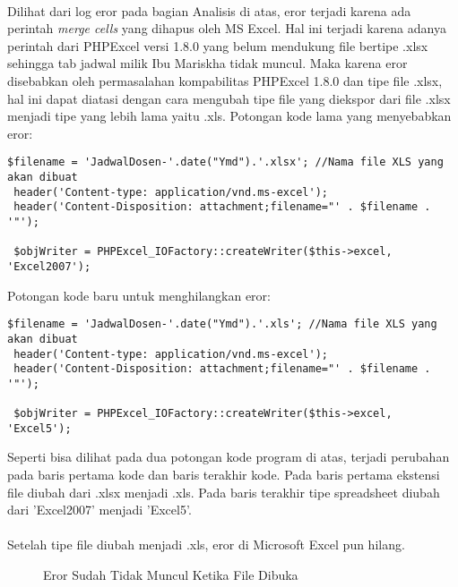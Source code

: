 \paragraph{}Dilihat dari log eror pada bagian Analisis di atas, eror terjadi karena ada perintah \textit{merge cells} yang dihapus oleh MS Excel. Hal ini terjadi karena adanya perintah dari PHPExcel versi 1.8.0 yang belum mendukung file bertipe .xlsx sehingga tab jadwal milik Ibu Mariskha tidak muncul. Maka karena eror disebabkan oleh permasalahan kompabilitas PHPExcel 1.8.0 dan tipe file .xlsx,  hal ini dapat diatasi dengan cara mengubah tipe file yang diekspor dari file .xlsx menjadi tipe yang lebih lama yaitu .xls.
\newline
\newline
Potongan kode lama yang menyebabkan eror:
\begin{lstlisting}[caption={Kode Lama},captionpos=b]
 $filename = 'JadwalDosen-'.date("Ymd").'.xlsx'; //Nama file XLS yang akan dibuat
 header('Content-type: application/vnd.ms-excel');
 header('Content-Disposition: attachment;filename="' . $filename . '"');

 $objWriter = PHPExcel_IOFactory::createWriter($this->excel, 'Excel2007');
\end{lstlisting}
Potongan kode baru untuk menghilangkan eror:
\begin{lstlisting}[caption={Kode Baru},captionpos=b]
 $filename = 'JadwalDosen-'.date("Ymd").'.xls'; //Nama file XLS yang akan dibuat
 header('Content-type: application/vnd.ms-excel');
 header('Content-Disposition: attachment;filename="' . $filename . '"');

 $objWriter = PHPExcel_IOFactory::createWriter($this->excel, 'Excel5');
\end{lstlisting}
Seperti bisa dilihat pada dua potongan kode program di atas, terjadi perubahan pada baris pertama kode dan baris terakhir kode. Pada baris pertama ekstensi file diubah dari .xlsx menjadi .xls. Pada baris terakhir tipe spreadsheet diubah dari 'Excel2007' menjadi 'Excel5'.
\paragraph{}Setelah tipe file diubah menjadi  .xls, eror di Microsoft Excel pun hilang.
\begin{figure} [H]
	\centering  
	\caption[Eror Sudah Tidak Muncul Ketika File Dibuka]{Eror Sudah Tidak Muncul Ketika File Dibuka} 
	\label{fig:eror-hilang} 
\end{figure}

